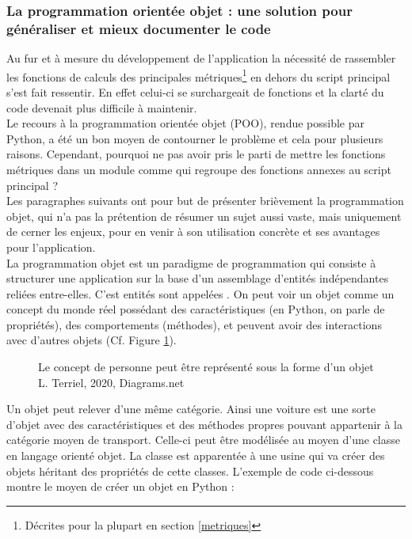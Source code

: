 \subsubsection{La programmation orientée objet : une solution pour généraliser et mieux documenter le code}
Au fur et à mesure du développement de l'application la nécessité de rassembler les fonctions de calculs des principales métriques\footnote{Décrites pour la plupart en section \ref{metriques}} en dehors du script principal  s'est fait ressentir. En effet celui-ci se surchargeait de fonctions et la clarté du code devenait plus difficile à maintenir.\\ 

Le recours à la programmation orientée objet (POO), rendue possible par Python, a été un bon moyen de contourner le problème et cela pour plusieurs raisons. Cependant, pourquoi ne pas avoir pris le parti de mettre les fonctions métriques dans un module comme  qui regroupe des fonctions annexes au script principal ?\\ 

Les paragraphes suivants ont pour but de présenter brièvement la programmation objet, qui n'a pas la prétention de résumer un sujet aussi vaste, mais uniquement de cerner les enjeux, pour en venir à son utilisation concrète et ses avantages pour l'application.\\

La programmation objet est un paradigme de programmation qui consiste à structurer une application sur la base d'un assemblage d'entités indépendantes reliées entre-elles. C'est entités sont appelées . On peut voir un objet comme un concept du monde réel possédant des caractéristiques (en Python, on parle de propriétés), des comportements (méthodes), et peuvent avoir des interactions avec d'autres objets (Cf. Figure \ref{fig:concept_POO}). 
\begin{figure}[H]
    \centering
    \centerline{}
    \caption{Le concept de personne peut être représenté sous la forme d'un objet \textcopyright L. Terriel, 2020, Diagrams.net}
    \label{fig:concept_POO}
\end{figure}
\newpage
Un objet peut relever d'une même catégorie. Ainsi une voiture est une sorte d'objet avec des caractéristiques et des méthodes propres pouvant appartenir à la catégorie moyen de transport. Celle-ci peut être modélisée au moyen d'une classe en langage orienté objet. La classe est apparentée à une usine qui va créer des objets héritant des propriétés de cette classes. L'exemple de code ci-dessous montre le moyen de créer un objet  en Python :

